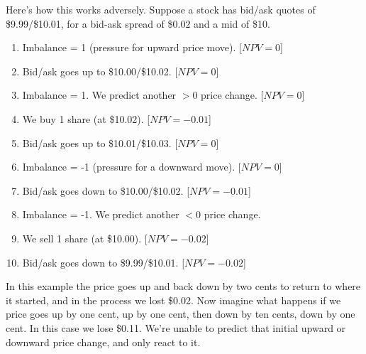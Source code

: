 Here's how this works adversely. Suppose a stock has bid/ask quotes of \$9.99/\$10.01, for a bid-ask spread of \$0.02 and a mid of \$10.

\begin{enumerate}
\item Imbalance = 1 (pressure for upward price move). [$NPV = 0$]
\item Bid/ask goes up to \$10.00/\$10.02. [$NPV = 0$]
\item Imbalance = 1. We predict another $>0$ price change. [$NPV = 0$]
\item We buy 1 share (at \$10.02). [$NPV = -0.01$]
\item Bid/ask goes up to \$10.01/\$10.03. [$NPV = 0$]
\item Imbalance = -1 (pressure for a downward move). [$NPV = 0$]
\item Bid/ask goes down to \$10.00/\$10.02. [$NPV = -0.01$]
\item Imbalance = -1. We predict another $<0$ price change. 
\item We sell 1 share (at \$10.00). [$NPV = -0.02$]
\item Bid/ask goes down to \$9.99/\$10.01. [$NPV = -0.02$]
\end{enumerate}

In this example the price goes up and back down by two cents to return to where it started, and in the process we lost \$0.02. Now imagine what happens if we price goes up by one cent, up by one cent, then down by ten cents, down by one cent. In this case we lose \$0.11. We're unable to predict that initial upward or downward price change, and only react to it. 